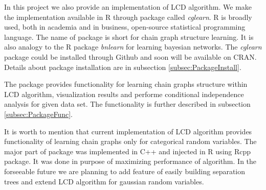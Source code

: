 %
%


In this project we also provide an implementation of LCD algorithm. We make the implementation available in R through package called \textit{cglearn}.
R is broadly used, both in academia and in business, open-source statistical programming language. The name of package is short for chain graph structure learning.
It is also analogy to the R package \textit{bnlearn} for learning bayesian networks.
The \textit{cglearn} package could be installed through Github and soon will be available on CRAN. Details about package installation are in subsection \ref{subsec:PackageInstall}.

The package provides functionality for learning chain graphs structure within LCD algorithm, visualization results and performe conditional independence analysis for given 
data set. The functionality is further described in subsection \ref{subsec:PackageFunc}.

It is worth to mention that current implementation of LCD algorithm provides functionality of learning chain graphs only for categorical random variables.
The major part of package was implemented in C++ and injected in R using Rcpp package. It was done in purpose of maximizing performance of algorithm. 
In the forseeable future we are planning to add feature of easily building separation trees and extend LCD algorithm for gaussian random variables.










